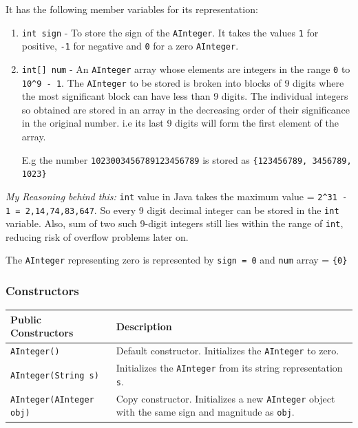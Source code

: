 \documentclass[a4paper,12pt]{article}
\begin{document}
It has the following member variables for its representation:

\begin{enumerate}
    \item \texttt{int sign} - To store the sign of the \texttt{AInteger}. It takes the values \texttt{1} for positive, \texttt{-1} for negative and \texttt{0} for a zero \texttt{AInteger}.
    \item \texttt{int[] num} - An \texttt{AInteger} array whose elements are integers in the range \texttt{0} to \texttt{10\^{}9 - 1}. The \texttt{AInteger} to be stored is broken into blocks of 9 digits where the most significant block can have less than 9 digits. The individual integers so obtained are stored in an array in the decreasing order of their significance in the original number. i.e its last 9 digits will form the first element of the array.

    E.g the number \texttt{1023003456789123456789} is stored as \texttt{\{123456789, 3456789, 1023\}}
\end{enumerate}

\textit{My Reasoning behind this:} \texttt{int} value in Java takes the maximum value = \texttt{2\^{}31 - 1 = 2,14,74,83,647}. So every 9 digit decimal integer can be stored in the \texttt{int} variable. Also, sum of two such 9-digit integers still lies within the range of \texttt{int}, reducing risk of overflow problems later on.

The \texttt{AInteger} representing zero is represented by \texttt{sign = 0} and \texttt{num} array = \texttt{\{0\}}

\subsubsection{Constructors}

\begin{center}
\begin{tabular}{|l|p{8cm}|}
\hline
\textbf{Public Constructors} & \textbf{Description} \\
\hline
\texttt{AInteger()} & Default constructor. Initializes the \texttt{AInteger} to zero. \\
\hline
\texttt{AInteger(String s)} & Initializes the \texttt{AInteger} from its string representation \texttt{s}. \\
\hline
\texttt{AInteger(AInteger obj)} & Copy constructor. Initializes a new \texttt{AInteger} object with the same sign and magnitude as \texttt{obj}. \\
\hline
\end{tabular}
\end{center}
\end{document}
